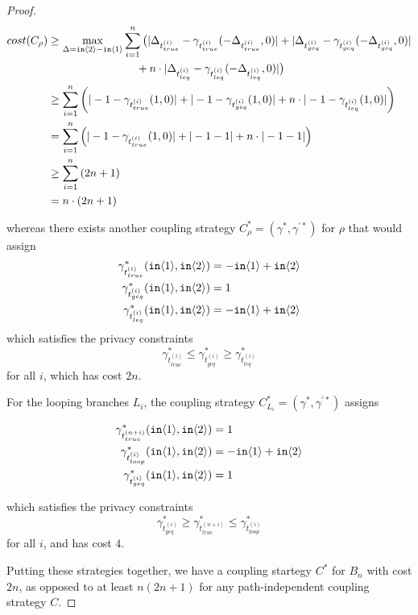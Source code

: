 \begin{proof}
    \begin{align*}
        cost(C_\rho) &\geq \max_{\Delta = \texttt{in}\langle2 \rangle - \texttt{in}\langle1 \rangle} \sum_{i=1}^{n} \big(|\Delta_{t_{true}^{(i)}} - \gamma_{t_{true}^{(i)}}(-\Delta_{t_{true}^{(i)}}, 0)| + |\Delta_{t_{geq}^{(i)}} - \gamma_{t_{geq}^{(i)}}(-\Delta_{t_{geq}^{(i)}}, 0)| \\ & \qquad \qquad \qquad \qquad + n \cdot |\Delta_{t_{leq}^{(i)}} - \gamma_{t_{leq}^{(i)}}(-\Delta_{t_{leq}^{(i)}}, 0)|\big)\\
        &\geq \sum_{i = 1}^n \left(|-1 - \gamma_{t_{true}^{(i)}}(1, 0)| + |-1 - \gamma_{t_{geq}^{(i)}}(1, 0)| + n \cdot |-1 - \gamma_{t_{leq}^{(i)}}(1, 0)|\right)\\
        &= \sum_{i = 1}^n \left(|-1 - \gamma_{t_{true}^{(i)}}(1, 0)| + |-1 - 1| + n \cdot |-1 - 1|\right)\\
        &\geq \sum_{i = 1}^n \left(2 n + 1\right)\\
        &= n \cdot (2 n + 1)
    \end{align*} 

    whereas there exists another coupling strategy $C_\rho^* = (\gamma^*, \gamma^{'*})$ for $\rho$ that would assign 
    \begin{align*}
        \gamma_{t_{true}^{(i)}}^*(\texttt{in}\langle1 \rangle, \texttt{in}\langle2 \rangle) &= -\texttt{in}\langle1 \rangle + \texttt{in}\langle2 \rangle\\
        \gamma_{t_{geq}^{(i)}}^*(\texttt{in}\langle1 \rangle, \texttt{in}\langle2 \rangle) &= 1\\
        \gamma_{t_{leq}^{(i)}}^*(\texttt{in}\langle1 \rangle, \texttt{in}\langle2 \rangle) &= -\texttt{in}\langle1 \rangle + \texttt{in}\langle2 \rangle
    \end{align*}
    which satisfies the privacy constraints \[\gamma_{t_{true}^{(i)}}^* \leq \gamma_{t_{geq}^{(i)}}^* \geq \gamma_{t_{leq}^{(i)}}^*\] for all $i$, which has cost $2n$.
    
    For the looping branches $L_i$, the coupling strategy $C_{L_i}^* = (\gamma^*, \gamma^{'*})$ assigns

    \begin{align*}
        \gamma_{t_{true}^{(n + i)}}^*(\texttt{in}\langle1 \rangle, \texttt{in}\langle2 \rangle) &= 1\\
        \gamma_{t_{loop}^{(i)}}^*(\texttt{in}\langle1 \rangle, \texttt{in}\langle2 \rangle) &= -\texttt{in}\langle1 \rangle + \texttt{in}\langle2 \rangle\\
        \gamma_{t_{geq}^{(i)}}^*(\texttt{in}\langle1 \rangle, \texttt{in}\langle2 \rangle) &= 1
    \end{align*}

    which satisfies the privacy constraints \[\gamma_{t_{geq}^{(i)}}^* \geq \gamma_{t_{true}^{(n + i)}}^* \leq \gamma_{t_{loop}^{(i)}}^*\] for all $i$, and has cost $4$.
    
    Putting these strategies together, we have a coupling startegy $C^*$ for $B_n$ with cost $2n$, as opposed to at least $n (2n + 1)$ for any path-independent coupling strategy $C$.
\end{proof}
